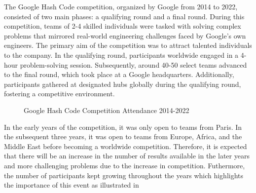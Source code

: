 The Google Hash Code competition, organized by Google from 2014 to 2022,
consisted of two main phases: a qualifying round and a final round. During this
competition, teams of 2-4 skilled individuals were tasked with solving complex
problems that mirrored real-world engineering challenges faced by Google's own
engineers. The primary aim of the competition was to attract talented
individuals to the company. In the qualifying round, participants worldwide
engaged in a 4-hour problem-solving session. Subsequently, around 40-50 select
teams advanced to the final round, which took place at a Google headquarters.
Additionally, participants gathered at designated hubs globally during the
qualifying round, fostering a competitive environment.

\testdata

\begin{figure}[h]
  \centering
  \caption{Google Hash Code Competition Attendance 2014-2022}
  \label{fig:hashcode-attendance}
\end{figure}


In the early years of the competition, it was only open to teams from Paris. In
the subsequent three years, it was open to teams from Europe, Africa, and the
Middle East before becoming a worldwide competition. Therefore, it is expected
that there will be an increase in the number of results available in the later
years and more challenging problems due to the increase in competition. Futhermore,
the number of participants kept growing throughout the years which highlights
the importance of this event as illustrated in~

